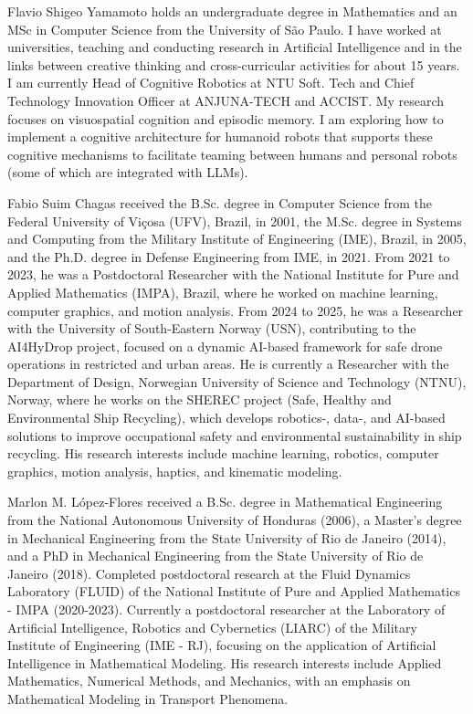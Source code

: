 \documentclass{ieeeaccess}
\begin{document}
\begin{IEEEbiographynophoto}{Flavio Shigeo Yamamoto} holds an undergraduate degree in Mathematics and an MSc in Computer Science from the University of São Paulo. I have worked at universities, teaching and conducting research in Artificial Intelligence and in the links between creative thinking and cross-curricular activities for about 15 years. I am currently Head of Cognitive Robotics at NTU Soft. Tech and Chief Technology Innovation Officer at ANJUNA-TECH and ACCIST. My research focuses on visuospatial cognition and episodic memory. I am exploring how to implement a cognitive architecture for humanoid robots that supports these cognitive mechanisms to facilitate teaming between humans and personal robots (some of which are integrated with LLMs).
\end{IEEEbiographynophoto}

\begin{IEEEbiographynophoto}{Fabio Suim Chagas}
received the B.Sc. degree in Computer Science from the Federal University of Viçosa (UFV), Brazil, in 2001, the M.Sc. degree in Systems and Computing from the Military Institute of Engineering (IME), Brazil, in 2005, and the Ph.D. degree in Defense Engineering from IME, in 2021. From 2021 to 2023, he was a Postdoctoral Researcher with the National Institute for Pure and Applied Mathematics (IMPA), Brazil, where he worked on machine learning, computer graphics, and motion analysis. From 2024 to 2025, he was a Researcher with the University of South-Eastern Norway (USN), contributing to the AI4HyDrop project, focused on a dynamic AI-based framework for safe drone operations in restricted and urban areas. He is currently a Researcher with the Department of Design, Norwegian University of Science and Technology (NTNU), Norway, where he works on the SHEREC project (Safe, Healthy and Environmental Ship Recycling), which develops robotics-, data-, and AI-based solutions to improve occupational safety and environmental sustainability in ship recycling. His research interests include machine learning, robotics, computer graphics, motion analysis, haptics, and kinematic modeling.
\end{IEEEbiographynophoto}

\begin{IEEEbiographynophoto}{Marlon M. L\'{o}pez-Flores} received a B.Sc. degree in Mathematical Engineering from the National Autonomous University of Honduras (2006), a Master's degree in Mechanical Engineering from the State University of Rio de Janeiro (2014), and a PhD in Mechanical Engineering from the State University of Rio de Janeiro (2018). Completed postdoctoral research at the Fluid Dynamics Laboratory (FLUID) of the National Institute of Pure and Applied Mathematics - IMPA (2020-2023). Currently a postdoctoral researcher at the Laboratory of Artificial Intelligence, Robotics and Cybernetics (LIARC) of the Military Institute of Engineering (IME - RJ), focusing on the application of Artificial Intelligence in Mathematical Modeling. His research interests include Applied Mathematics, Numerical Methods, and Mechanics, with an emphasis on Mathematical Modeling in Transport Phenomena.
\end{IEEEbiographynophoto}
\end{document}
